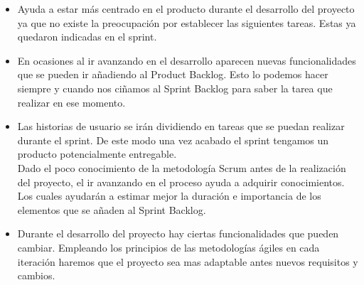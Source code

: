 \begin{itemize}
\item Ayuda a estar más centrado en el producto durante el desarrollo del proyecto ya que no existe la preocupación por establecer las siguientes tareas.  Estas ya quedaron indicadas en el sprint. 



\item En ocasiones al ir avanzando en el desarrollo aparecen nuevas funcionalidades que se pueden ir añadiendo al Product Backlog. Esto lo podemos hacer siempre y cuando nos ciñamos al Sprint Backlog
 para saber la tarea que realizar en ese momento.


\item  Las historias de usuario se irán dividiendo en tareas que se puedan realizar durante el sprint. De este modo una vez acabado el sprint tengamos un producto potencialmente entregable.\\

Dado el poco conocimiento de la metodología Scrum antes de la realización del proyecto, el ir avanzando en el proceso ayuda a adquirir conocimientos. Los cuales ayudarán a estimar mejor la duración e importancia de los elementos que se añaden al Sprint Backlog.


\item
Durante el desarrollo del proyecto hay ciertas funcionalidades que pueden cambiar. Empleando los principios de las metodologías ágiles en cada iteración haremos que el proyecto sea mas adaptable antes nuevos requisitos y cambios.

\end{itemize}

